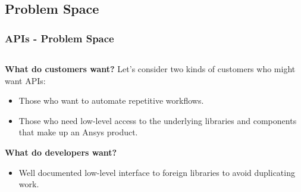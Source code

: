 \documentclass[t]{beamer}
\begin{document}
\subsection{Problem Space}
\begin{frame}
  \frametitle{APIs - Problem Space}

  \begin{columns}[T]
    \begin{column}{.6\textwidth}


      \textbf{What do customers want?} Let's consider two kinds of customers
      who might want APIs:

      \begin{itemize}
      \item{Those who want to automate repetitive workflows.}
      \item{Those who need low-level access to the underlying libraries and
        components that make up an Ansys product.}
      \end{itemize}



      \textbf{What do developers want?}

      \begin{itemize}
      \item{Well documented low-level interface to foreign libraries to avoid
        duplicating work.}
      \end{itemize}


    \end{column}


\end{columns}
\end{frame}
\end{document}
